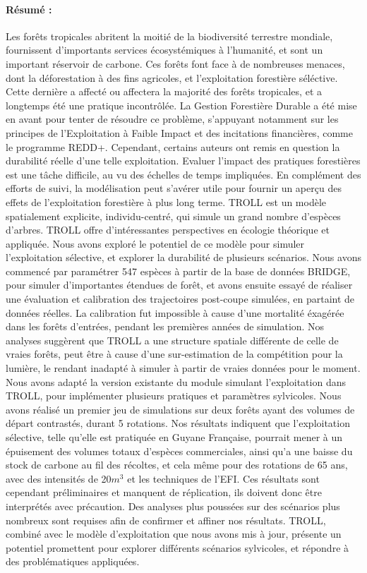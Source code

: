\newpage
\scriptsize{
\paragraph{Résumé :}
Les forêts tropicales abritent la moitié de la biodiversité terrestre mondiale, fournissent d'importants services écosystémiques à l'humanité, et sont un important réservoir de carbone. Ces forêts font face à de nombreuses menaces, dont la déforestation à des fins agricoles, et l'exploitation forestière séléctive. Cette dernière a affecté ou affectera la majorité des forêts tropicales, et a longtemps été une pratique incontrôlée. La Gestion Forestière Durable a été mise en avant pour tenter de résoudre ce problème, s'appuyant notamment sur les principes de l'Exploitation à Faible Impact et des incitations financières, comme le programme REDD+. Cependant, certains auteurs ont remis en question la durabilité réelle d'une telle exploitation. Evaluer l'impact des pratiques forestières est une tâche difficile, au vu des échelles de temps impliquées. En complément des efforts de suivi, la modélisation peut s'avérer utile pour fournir un aperçu des effets de l'exploitation forestière à plus long terme.   
TROLL est un modèle spatialement explicite, individu-centré, qui simule un grand nombre d'espèces d'arbres. TROLL offre d'intéressantes perspectives en écologie théorique et appliquée. Nous avons exploré le potentiel de ce modèle pour simuler l'exploitation sélective, et explorer la durabilité de plusieurs scénarios.  Nous avons commencé par paramétrer 547 espèces à partir de la base de données BRIDGE, pour simuler d'importantes étendues de forêt, et avons ensuite essayé de réaliser une évaluation et calibration des trajectoires post-coupe simulées, en partaint de données réelles. La calibration fut impossible à cause d'une mortalité éxagérée dans les forêts d'entrées, pendant les premières années de simulation. Nos analyses suggèrent que TROLL a une structure spatiale différente de celle de vraies forêts, peut être à cause d'une sur-estimation de la compétition pour la lumière, le rendant inadapté à simuler à partir de vraies données pour le moment. Nous avons adapté la version existante du module simulant l'exploitation dans TROLL, pour implémenter plusieurs pratiques et paramètres sylvicoles. Nous avons réalisé un premier jeu de simulations sur deux forêts ayant des volumes de départ contrastés, durant 5 rotations. Nos résultats indiquent que l'exploitation sélective, telle qu'elle est pratiquée en Guyane Française, pourrait mener à un épuisement des volumes totaux d'espèces commerciales, ainsi qu'a une baisse du stock de carbone au fil des récoltes, et cela même pour des rotations de 65 ans, avec des intensités de 20$m^3$ et les techniques de l'EFI. Ces résultats sont cependant préliminaires et manquent de réplication, ils doivent donc être interprétés avec précaution. Des analyses plus poussées sur des scénarios plus nombreux sont requises afin de confirmer et affiner nos résultats. TROLL, combiné avec le modèle d'exploitation que nous avons mis à jour, présente un potentiel promettent pour explorer différents scénarios sylvicoles, et répondre à des problématiques appliquées.
}
